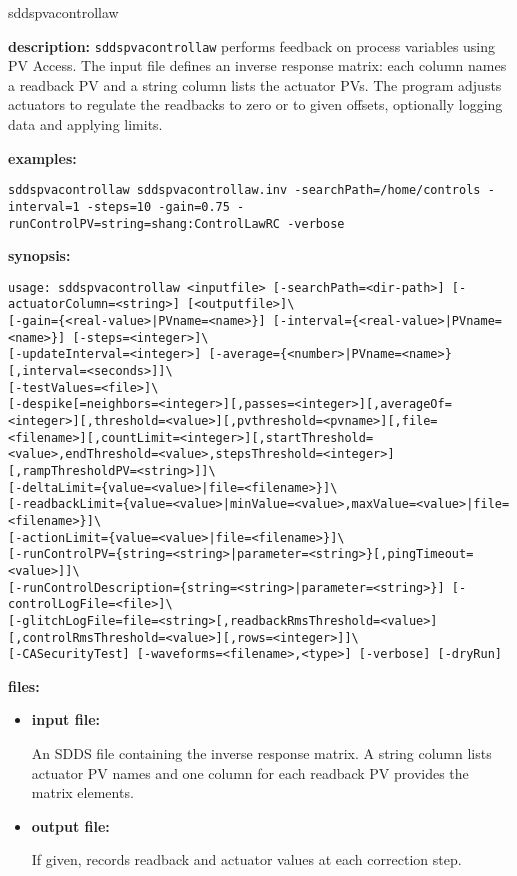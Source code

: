 %
\begin{sddsprog}{sddspvacontrollaw}
\item \textbf{description:}
\verb+sddspvacontrollaw+ performs feedback on process variables using PV Access. The
input file defines an inverse response matrix: each column names a readback PV and a
string column lists the actuator PVs. The program adjusts actuators to regulate the
readbacks to zero or to given offsets, optionally logging data and applying limits.

\item \textbf{examples:}
\begin{verbatim}
sddspvacontrollaw sddspvacontrollaw.inv -searchPath=/home/controls -interval=1 -steps=10 -gain=0.75 -runControlPV=string=shang:ControlLawRC -verbose
\end{verbatim}

\item \textbf{synopsis:}
\begin{verbatim}
usage: sddspvacontrollaw <inputfile> [-searchPath=<dir-path>] [-actuatorColumn=<string>] [<outputfile>]\
[-gain={<real-value>|PVname=<name>}] [-interval={<real-value>|PVname=<name>}] [-steps=<integer>]\
[-updateInterval=<integer>] [-average={<number>|PVname=<name>}[,interval=<seconds>]]\
[-testValues=<file>]\
[-despike[=neighbors=<integer>][,passes=<integer>][,averageOf=<integer>][,threshold=<value>][,pvthreshold=<pvname>][,file=<filename>][,countLimit=<integer>][,startThreshold=<value>,endThreshold=<value>,stepsThreshold=<integer>][,rampThresholdPV=<string>]]\
[-deltaLimit={value=<value>|file=<filename>}]\
[-readbackLimit={value=<value>|minValue=<value>,maxValue=<value>|file=<filename>}]\
[-actionLimit={value=<value>|file=<filename>}]\
[-runControlPV={string=<string>|parameter=<string>}[,pingTimeout=<value>]]\
[-runControlDescription={string=<string>|parameter=<string>}] [-controlLogFile=<file>]\
[-glitchLogFile=file=<string>[,readbackRmsThreshold=<value>][,controlRmsThreshold=<value>][,rows=<integer>]]\
[-CASecurityTest] [-waveforms=<filename>,<type>] [-verbose] [-dryRun]
\end{verbatim}

\item \textbf{files:}
\begin{itemize}
  \item \textbf{input file:} \par
    An SDDS file containing the inverse response matrix. A string column lists actuator PV names and one column for each readback PV provides the matrix elements.
  \item \textbf{output file:} \par
    If given, records readback and actuator values at each correction step.
\end{itemize}


\end{sddsprog}
